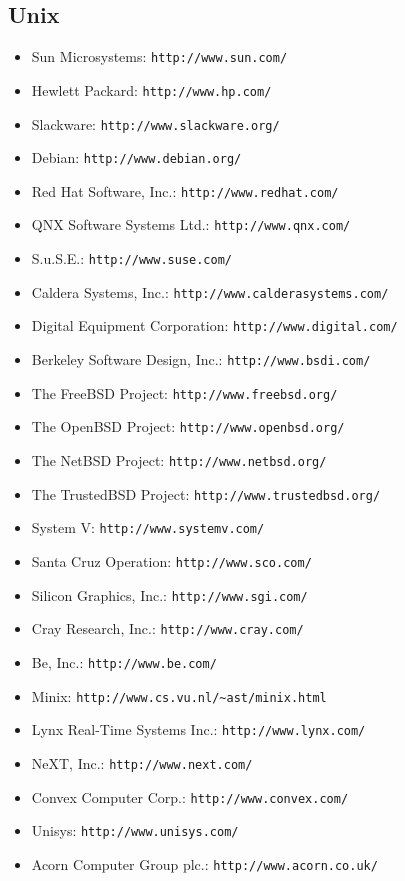 \subsection{Unix}
\begin{itemize}
\item Sun Microsystems: {\tt http://www.sun.com/}
\item Hewlett Packard: {\tt http://www.hp.com/}
\item Slackware: {\tt http://www.slackware.org/}
\item Debian: {\tt http://www.debian.org/}
\item Red Hat Software, Inc.: {\tt http://www.redhat.com/}
\item QNX Software Systems Ltd.: {\tt http://www.qnx.com/}
\item S.u.S.E.: {\tt http://www.suse.com/}
\item Caldera Systems, Inc.: {\tt http://www.calderasystems.com/}
\item Digital Equipment Corporation: {\tt http://www.digital.com/}
\item Berkeley Software Design, Inc.: {\tt http://www.bsdi.com/}
\item The FreeBSD Project: {\tt http://www.freebsd.org/}
\item The OpenBSD Project: {\tt http://www.openbsd.org/}
\item The NetBSD Project: {\tt http://www.netbsd.org/}
\item The TrustedBSD Project: {\tt http://www.trustedbsd.org/}
\item System V: {\tt http://www.systemv.com/}
\item Santa Cruz Operation: {\tt http://www.sco.com/}
\item Silicon Graphics, Inc.: {\tt http://www.sgi.com/}
\item Cray Research, Inc.: {\tt http://www.cray.com/}
\item Be, Inc.: {\tt http://www.be.com/}
\item Minix: {\tt http://www.cs.vu.nl/\~{}ast/minix.html}
\item Lynx Real-Time Systems Inc.: {\tt http://www.lynx.com/}
\item NeXT, Inc.: {\tt http://www.next.com/}
\item Convex Computer Corp.: {\tt http://www.convex.com/}
\item Unisys: {\tt http://www.unisys.com/}
\item Acorn Computer Group plc.: {\tt http://www.acorn.co.uk/}
\end{itemize}
